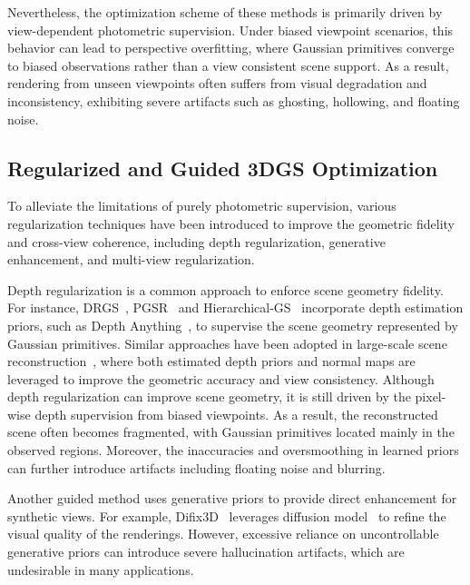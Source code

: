 \documentclass[lettersize,journal]{IEEEtran}
\begin{document}
Nevertheless,
the optimization scheme of these methods is primarily driven by view-dependent photometric supervision. Under biased viewpoint scenarios, this behavior can lead to perspective overfitting, where Gaussian primitives converge to biased observations rather than a view consistent scene support. As a result, rendering from unseen viewpoints often suffers from visual degradation and inconsistency, exhibiting severe artifacts such as ghosting, hollowing, and floating noise.

\subsection{Regularized and Guided 3DGS Optimization}

To alleviate the limitations of purely photometric supervision, various regularization techniques have been introduced to improve the geometric fidelity and cross-view coherence, including depth regularization, generative enhancement, and multi-view regularization. 

Depth regularization is a common approach to enforce scene geometry fidelity. For instance, DRGS~\cite{drgs}, PGSR~\cite{pgsr} and Hierarchical-GS~\cite{hierarchical} incorporate depth estimation priors, such as Depth Anything~\cite{dav2}, to supervise the scene geometry represented by Gaussian primitives. Similar approaches have been adopted in large-scale scene reconstruction~\cite{hierarchical,citygaussian}, where both estimated depth priors and normal maps are leveraged to improve the geometric accuracy and view consistency. 
Although depth regularization can improve scene geometry, it is still driven by the pixel-wise depth supervision from biased viewpoints. As a result, the reconstructed scene often becomes fragmented, with Gaussian primitives located mainly in the observed regions. Moreover, the inaccuracies and oversmoothing in learned priors can further introduce artifacts including floating noise and blurring.

Another guided method uses generative priors to provide direct enhancement for synthetic views. For example, Difix3D~\cite{difix3d+} leverages diffusion model~\cite{diffusion} to refine the visual quality of the renderings. 
However, excessive reliance on uncontrollable generative priors can introduce severe hallucination artifacts, which are undesirable in many applications.
\end{document}
